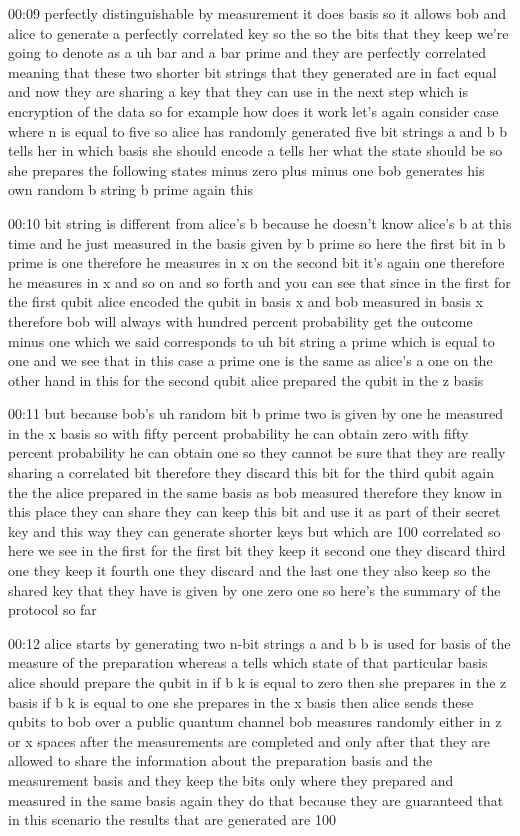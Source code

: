 00:09
perfectly distinguishable by measurement it does basis so it allows
bob and alice to generate a perfectly correlated
key so the so the bits that they keep we're going to denote as a uh bar and a
bar prime and they are perfectly correlated meaning that these two shorter bit
strings that they generated are in fact equal
and now they are sharing a key that they can use
in the next step which is encryption of the data
so for example how does it work let's again consider case where
n is equal to five so alice has randomly generated five bit strings a
and b b tells her in which basis she should encode a tells her what the
state should be so she prepares the following states minus zero plus
minus one bob generates his own random b string b prime again this

00:10
bit string is different from alice's b because he doesn't know alice's b at
this time and he just measured in the basis given by b
prime so here the first bit in b prime is one therefore he measures in x
on the second bit it's again one therefore he measures in x
and so on and so forth and you can see that since
in the first for the first qubit alice encoded the qubit in basis x
and bob measured in basis x therefore bob will
always with hundred percent probability get the outcome
minus one which we said corresponds to uh bit string a
prime which is equal to one and we see that in this case
a prime one is the same as alice's a one on the other hand
in this for the second qubit alice prepared the qubit in the z basis

00:11
but because bob's uh random bit b prime two is given by one
he measured in the x basis so with fifty percent probability he can obtain zero
with fifty percent probability he can obtain one
so they cannot be sure that they are really sharing a correlated
bit therefore they discard this bit for the third qubit again the the alice
prepared in the same basis as bob measured therefore they know in this place
they can share they can keep this bit and use it as part of their secret key
and this way they can generate shorter keys
but which are 100 correlated so here we see in the first for the first bit they
keep it second one they discard third one they keep it
fourth one they discard and the last one they also keep
so the shared key that they have is given by one zero one
so here's the summary of the protocol so far

00:12
alice starts by generating two n-bit strings a and b b is used for
basis of the measure of the preparation whereas
a tells which state of that particular basis alice should prepare the qubit in
if b k is equal to zero then she prepares in the z basis
if b k is equal to one she prepares in the x basis
then alice sends these qubits to bob over a public quantum channel
bob measures randomly either in z or x spaces
after the measurements are completed and only after that
they are allowed to share the information about the preparation basis
and the measurement basis and they keep the bits only where they prepared and
measured in the same basis again they do that because they are guaranteed
that in this scenario the results that are generated are 100

